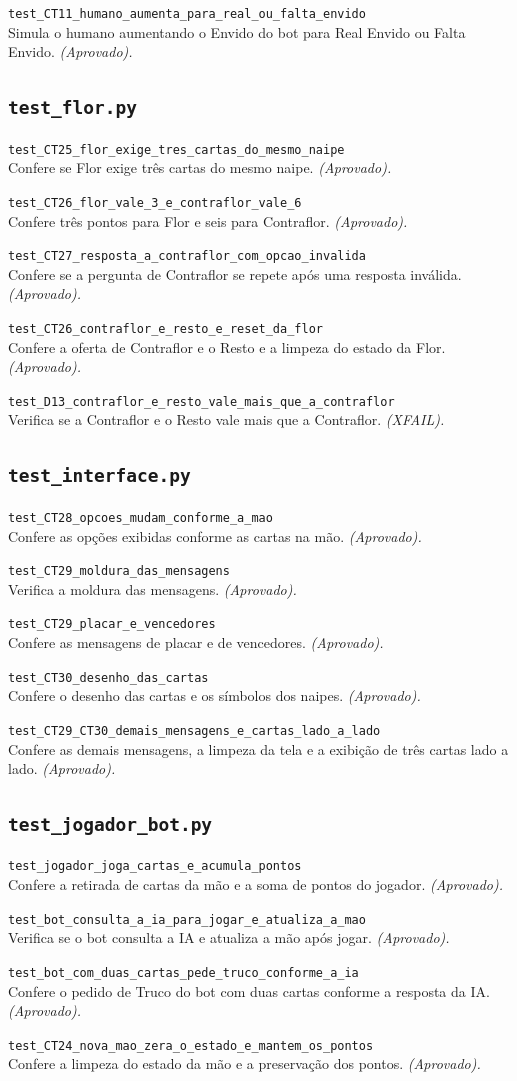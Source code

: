 \documentclass[11pt,a4paper]{article}
\newcommand{\teste}[3]{\par\noindent\begin{minipage}{\textwidth}\texttt{#1}\\#2 \emph{(#3).}\end{minipage}\par\vspace{0.15em}}
\begin{document}
\teste{test\_CT11\_humano\_aumenta\_para\_real\_ou\_falta\_envido}{Simula o humano aumentando o Envido do bot para Real Envido ou Falta Envido.}{Aprovado}
\subsection*{\texttt{\textbf{test\_flor.py}}}
\teste{test\_CT25\_flor\_exige\_tres\_cartas\_do\_mesmo\_naipe}{Confere se Flor exige três cartas do mesmo naipe.}{Aprovado}
\teste{test\_CT26\_flor\_vale\_3\_e\_contraflor\_vale\_6}{Confere três pontos para Flor e seis para Contraflor.}{Aprovado}
\teste{test\_CT27\_resposta\_a\_contraflor\_com\_opcao\_invalida}{Confere se a pergunta de Contraflor se repete após uma resposta inválida.}{Aprovado}
\teste{test\_CT26\_contraflor\_e\_resto\_e\_reset\_da\_flor}{Confere a oferta de Contraflor e o Resto e a limpeza do estado da Flor.}{Aprovado}
\teste{test\_D13\_contraflor\_e\_resto\_vale\_mais\_que\_a\_contraflor}{Verifica se a Contraflor e o Resto vale mais que a Contraflor.}{XFAIL}
\subsection*{\texttt{\textbf{test\_interface.py}}}
\teste{test\_CT28\_opcoes\_mudam\_conforme\_a\_mao}{Confere as opções exibidas conforme as cartas na mão.}{Aprovado}
\teste{test\_CT29\_moldura\_das\_mensagens}{Verifica a moldura das mensagens.}{Aprovado}
\teste{test\_CT29\_placar\_e\_vencedores}{Confere as mensagens de placar e de vencedores.}{Aprovado}
\teste{test\_CT30\_desenho\_das\_cartas}{Confere o desenho das cartas e os símbolos dos naipes.}{Aprovado}
\teste{test\_CT29\_CT30\_demais\_mensagens\_e\_cartas\_lado\_a\_lado}{Confere as demais mensagens, a limpeza da tela e a exibição de três cartas lado a lado.}{Aprovado}
\subsection*{\texttt{\textbf{test\_jogador\_bot.py}}}
\teste{test\_jogador\_joga\_cartas\_e\_acumula\_pontos}{Confere a retirada de cartas da mão e a soma de pontos do jogador.}{Aprovado}
\teste{test\_bot\_consulta\_a\_ia\_para\_jogar\_e\_atualiza\_a\_mao}{Verifica se o bot consulta a IA e atualiza a mão após jogar.}{Aprovado}
\teste{test\_bot\_com\_duas\_cartas\_pede\_truco\_conforme\_a\_ia}{Confere o pedido de Truco do bot com duas cartas conforme a resposta da IA.}{Aprovado}
\teste{test\_CT24\_nova\_mao\_zera\_o\_estado\_e\_mantem\_os\_pontos}{Confere a limpeza do estado da mão e a preservação dos pontos.}{Aprovado}
\end{document}
